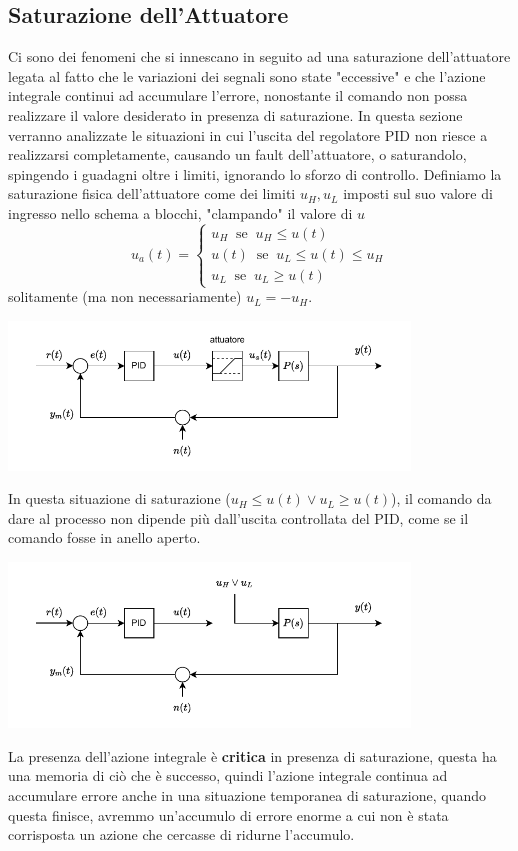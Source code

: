 \documentclass[10pt, letterpaper]{report}
\begin{document}
\subsection{Saturazione dell'Attuatore}
Ci sono dei fenomeni che si innescano in seguito ad una saturazione dell'attuatore legata al fatto che le variazioni dei segnali sono state "eccessive" e che l'azione integrale continui ad accumulare l'errore, nonostante il comando non possa realizzare il valore desiderato in presenza di saturazione. In questa sezione verranno analizzate le situazioni in cui l'uscita del regolatore PID non riesce a realizzarsi completamente, causando un fault dell'attuatore, o saturandolo, spingendo i guadagni oltre i limiti, ignorando lo sforzo di controllo.\acc 
Definiamo la saturazione fisica dell'attuatore come dei limiti $u_H,u_L$ imposti sul suo valore di ingresso nello schema a blocchi, "clampando" il valore di $u$
$$ 
u_a(t)=\begin{cases}
    u_H\ \text{ se }\ u_H\le u(t)\\ 
    u(t)\ \text{ se }\ u_L\le u(t)\le u_H\\ 
    u_L\ \text{ se }\ u_L\ge u(t)
\end{cases}
$$
solitamente (ma non necessariamente) $u_L=-u_H$.
\begin{center}
    \includegraphics[width=0.8\textwidth]{images/saturazione.pdf}
\end{center}
In questa situazione di saturazione ($u_H\le u(t)\lor u_L\ge u(t)$), il comando da dare al processo non dipende più dall'uscita controllata del PID, come se il comando fosse in anello aperto.
\begin{center}
    \includegraphics[width=0.8\textwidth]{images/saturazione2.pdf}
\end{center}
La presenza dell'azione integrale è \textbf{critica} in presenza di saturazione, questa ha una memoria di ciò che è successo, quindi l'azione integrale continua ad accumulare errore anche in una situazione temporanea di saturazione, quando questa finisce, avremmo un'accumulo di errore enorme a cui non è stata corrisposta un azione che cercasse di ridurne l'accumulo.
\end{document}
